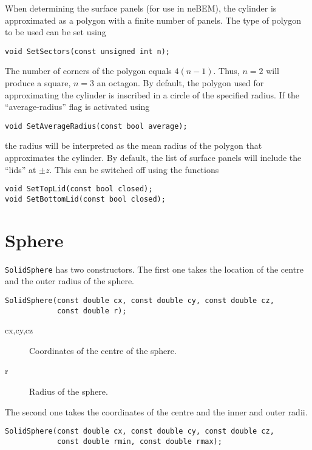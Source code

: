 When determining the surface panels (\eg for use in neBEM), 
the cylinder is approximated as a polygon with a finite number of panels.
The type of polygon to be used can be set using
\begin{lstlisting}
void SetSectors(const unsigned int n);
\end{lstlisting}
The number of corners of the polygon equals $4(n - 1)$.
Thus, $n = 2$ will produce a square, $n = 3$ an octagon.
By default, the polygon used for approximating the cylinder 
is inscribed in a circle of the specified radius. 
If the ``average-radius'' flag is activated using
\begin{lstlisting}
void SetAverageRadius(const bool average);
\end{lstlisting}
the radius will be interpreted as the mean radius of the polygon
that approximates the cylinder.
By default, the list of surface panels will include the ``lids'' at 
$\pm z$. This can be switched off using the functions 
\begin{lstlisting}
void SetTopLid(const bool closed);
void SetBottomLid(const bool closed);
\end{lstlisting}

\section{Sphere}
\texttt{SolidSphere} has two constructors.
The first one takes the location of the 
centre and the outer radius of the sphere.
\begin{lstlisting}
SolidSphere(const double cx, const double cy, const double cz,
            const double r);
\end{lstlisting}
\begin{description}
\item[cx,cy,cz] Coordinates of the centre of the sphere.
\item[r] Radius of the sphere.
\end{description}
The second one takes the coordinates of the centre and the inner and 
outer radii.
\begin{lstlisting}
SolidSphere(const double cx, const double cy, const double cz,
            const double rmin, const double rmax);
\end{lstlisting}


